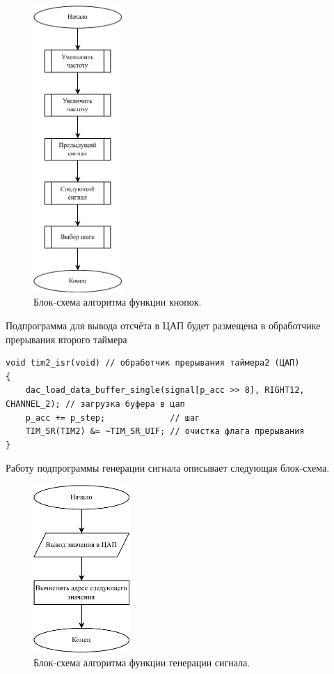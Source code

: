 	\begin{figure}[H]
    \centering
    \includegraphics[width=0.3\textwidth]{../image/buttons.pdf}
    \caption{Блок-схема алгоритма функции кнопок.}
	\end{figure}
	
	Подпрограмма для вывода отсчёта в ЦАП будет размещена в обработчике прерывания второго таймера
	
\begin{code}
\begin{verbatim}
void tim2_isr(void) // обработчик прерывания таймера2 (ЦАП)
{
    dac_load_data_buffer_single(signal[p_acc >> 8], RIGHT12, CHANNEL_2); // загрузка буфера в цап
    p_acc += p_step;             // шаг
    TIM_SR(TIM2) &= ~TIM_SR_UIF; // очистка флага прерывания
}
\end{verbatim}
\end{code}

	Работу подпрограммы генерации сигнала описывает следующая блок-схема.
	
	\begin{figure}[H]
    \centering
    \includegraphics[width=0.325\textwidth]{../image/dac.pdf}
    \caption{Блок-схема алгоритма функции генерации сигнала.}
	\end{figure}

